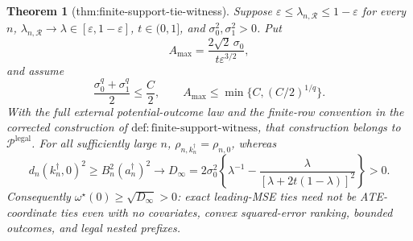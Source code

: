 \documentclass{article}
\newtheorem{theorem}{Theorem}
\begin{document}
\begin{theorem}[thm:finite-support-tie-witness]\label{thm:finite-support-tie-witness}
Suppose \(\varepsilon\leq\lambda_{n,\mathcal R}\leq1-\varepsilon\) for every \(n\), \(\lambda_{n,\mathcal R}\to\lambda\in[\varepsilon,1-\varepsilon]\), \(t\in(0,1]\), and \(\sigma_0^2,\sigma_1^2>0\).  Put
\[
 A_{\max}=\frac{2\sqrt2\,\sigma_0}{t\varepsilon^{3/2}},
\]
and assume
\[
 \frac{\sigma_0^q+\sigma_1^q}{2}\leq\frac C2,
 \qquad A_{\max}\leq\min\{C,(C/2)^{1/q}\}.
\]
With the full external potential-outcome law and the finite-row convention in the corrected construction of \(\mathrm{def:finite\text{-}support\text{-}witness}\), that construction belongs to \(\mathcal P^{\mathrm{legal}}\).  For all sufficiently large \(n\), \(\rho_{n,k_n^{\dagger}}=\rho_{n,0}\), whereas
\[
 d_n(k_n^{\dagger},0)^2\geq B_n^2(a_n^{\dagger})^2
 \longrightarrow
 D_\infty=2\sigma_0^2\left\{\lambda^{-1}-
 \frac{\lambda}{[\lambda+2t(1-\lambda)]^2}\right\}>0.
\]
Consequently \(\omega^{\star}(0)\geq\sqrt{D_\infty}>0\): exact leading-MSE ties need not be ATE-coordinate ties even with no covariates, convex squared-error ranking, bounded outcomes, and legal nested prefixes.
\end{theorem}
\end{document}
